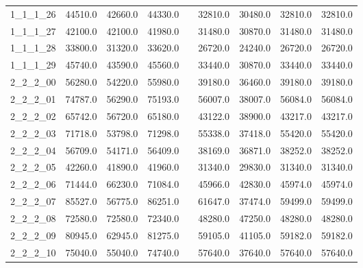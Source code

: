 \begin{longtable}{lrrrcrrrr}
1\_1\_1\_26      &     44510.0 &       42660.0 &        44330.0 &&       32810.0 &         30480.0 &          32810.0 &          32810.0 \\
1\_1\_1\_27      &     42100.0 &       42100.0 &        41980.0 &&       31480.0 &         30870.0 &          31480.0 &          31480.0 \\
1\_1\_1\_28      &     33800.0 &       31320.0 &        33620.0 &&       26720.0 &         24240.0 &          26720.0 &          26720.0 \\
1\_1\_1\_29      &     45740.0 &       43590.0 &        45560.0 &&       33440.0 &         30870.0 &          33440.0 &          33440.0 \\
2\_2\_2\_00      &     56280.0 &       54220.0 &        55980.0 &&       39180.0 &         36460.0 &          39180.0 &          39180.0 \\
2\_2\_2\_01      &     74787.0 &       56290.0 &        75193.0 &&       56007.0 &         38007.0 &          56084.0 &          56084.0 \\
2\_2\_2\_02      &     65742.0 &       56720.0 &        65180.0 &&       43122.0 &         38900.0 &          43217.0 &          43217.0 \\
2\_2\_2\_03      &     71718.0 &       53798.0 &        71298.0 &&       55338.0 &         37418.0 &          55420.0 &          55420.0 \\
2\_2\_2\_04      &     56709.0 &       54171.0 &        56409.0 &&       38169.0 &         36871.0 &          38252.0 &          38252.0 \\
2\_2\_2\_05      &     42260.0 &       41890.0 &        41960.0 &&       31340.0 &         29830.0 &          31340.0 &          31340.0 \\
2\_2\_2\_06      &     71444.0 &       66230.0 &        71084.0 &&       45966.0 &         42830.0 &          45974.0 &          45974.0 \\
2\_2\_2\_07      &     85527.0 &       56775.0 &        86251.0 &&       61647.0 &         37474.0 &          59499.0 &          59499.0 \\
2\_2\_2\_08      &     72580.0 &       72580.0 &        72340.0 &&       48280.0 &         47250.0 &          48280.0 &          48280.0 \\
2\_2\_2\_09      &     80945.0 &       62945.0 &        81275.0 &&       59105.0 &         41105.0 &          59182.0 &          59182.0 \\
2\_2\_2\_10      &     75040.0 &       55040.0 &        74740.0 &&       57640.0 &         37640.0 &          57640.0 &          57640.0 \\

\end{longtable}
